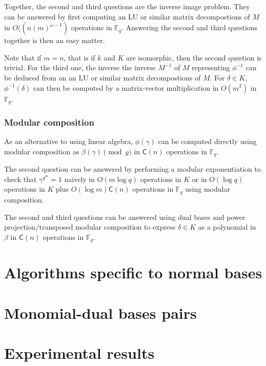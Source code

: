 \documentclass[12pt]{article}
\theoremstyle{plain}
\theoremstyle{definition}
\def\F{\ensuremath{\mathbb{F}}}
\def\MC{\ensuremath{\mathsf{C}}}
\begin{document}
Together, the second and third questions are the inverse image problem.
They can be answered by first computing 
an LU or similar matrix decompostions of $M$
in $O((n (m)^{\omega - 1})$ operations in $\F_q$.
Answering the second and third questions together is then
an easy matter.

Note that if $m = n$, that is if $k$ and $K$ are
isomorphic, then the second question is trivial.
For the third one, the inverse
the inverse $M^{-1}$ of $M$ representing $\phi^{-1}$
can be deduced from an an LU or similar matrix decompostions of $M$.
For $\delta \in K$, $\phi^{-1}(\delta)$ can then be computed by a
matrix-vector multiplication in $O(m^2)$ in $\F_q$.

\subsubsection{Modular composition}

As an alternative to using linear algebra,
$\phi(\gamma)$ can be computed directly using modular composition
as $\beta(\gamma) \pmod{g}$ in $\MC(n)$ operations in $\F_q$.

The second question can be answered by performing a modular
exponentiation to check that $\gamma^{q^{m}} = 1$
naively in $O(m \log q)$ operations in $K$
or in $O(\log q)$ operations in $K$ plus
$O(\log m) \MC(n)$ operations in $\F_q$ using modular composition.

The second and third questions can be answered using
dual bases and power projection/transposed modular composition
to express $\delta \in K$ as a polynomial in $\beta$ in
$\MC(n)$ operations in $\F_q$.



\section{Algorithms specific to normal bases}


\section{Monomial-dual bases pairs}


\section{Experimental results}
\end{document}
